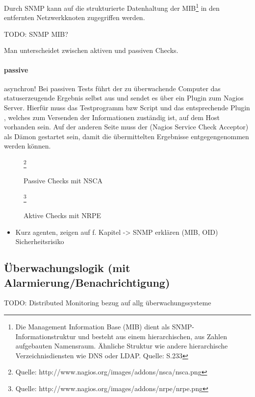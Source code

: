Durch SNMP kann auf die strukturierte Datenhaltung der MIB\footnote{Die Management Information Base (\gls{MIB}) dient als SNMP-Informationstruktur und besteht aus einem hierarchischen, aus Zahlen aufgebauten Namensraum. Ähnliche Struktur wie andere hierarchische Verzeichnisdiensten wie \gls{DNS} oder \gls{LDAP}. Quelle: \cite{Barth08} S.233} in den entfernten Netzwerkknoten zugegriffen werden.

\begin{center}
TODO: SNMP MIB?
\end{center}



Man unterscheidet zwischen aktiven und passiven Checks.
\paragraph{passive}
asynchron!
Bei passiven Tests führt der zu überwachende Computer das statuserzeugende Ergebnis selbst aus und sendet es über ein Plugin zum Nagios Server.
Hierfür muss das Testprogramm bzw Script und das entsprechende Plugin , welches zum Versenden der Informationen zuständig ist, auf dem Host vorhanden sein.
Auf der anderen Seite muss der  (Nagios Service Check Acceptor) als Dämon gestartet sein, damit die übermittelten Ergebnisse entgegengenommen werden können.
\begin{figure}[ht]
	\centering
		\caption{Passive Checks mit NSCA}\footnote{Quelle: http://www.nagios.org/images/addons/nsca/nsca.png}
		\label{passivchecks}
\end{figure}


\begin{figure}[ht]
	\centering
		\caption{Aktive Checks mit NRPE}\footnote{Quelle: http://www.nagios.org/images/addons/nrpe/nrpe.png}
		\label{aktivchecks}
\end{figure}
\begin{itemize}
\item Kurz agenten, zeigen auf f. Kapitel -> SNMP erklären (MIB, OID) Sicherheitsrisiko
\end{itemize}

\subsection{Überwachungslogik (mit Alarmierung/Benachrichtigung)}
\label{dismoni}
\begin{center}
TODO: Distributed Monitoring bezug auf allg überwachungssysteme
\end{center}
